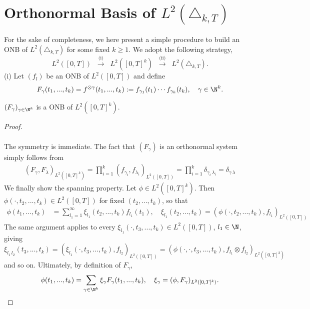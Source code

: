 \section{Orthonormal Basis of $L^2(\triangle_{k,T})$}
For the sake of completeness, we here present a simple procedure to build an ONB of $L^2(\triangle_{k,T})$ for some fixed $k\ge 1$. We adopt the following strategy,
$$ L^2([0,T]) \;\; \overset{\text{(i)}}{\longrightarrow}
 \;\; L^2([0,T]^k) \;\; \overset{\text{(ii)}}{\longrightarrow} \;\; L^2(\triangle_{k,T}).$$
 (i) 
Let $(f_l)$ be an ONB of $L^2([0,T])$  and define
    $$F_{\gamma}(t_1,...,t_k) = f^{\otimes \gamma}(t_1,...,t_k) := f_{\gamma_1}(t_1)\cdots f_{\gamma_k}(t_k),\quad  \gamma \in \N^k. $$
    
\begin{proposition}
    $(F_{\gamma})_{\gamma \in \N^k}$ is a  ONB of $L^2([0,T]^k)$. 
\end{proposition}
\begin{proof}
\\
\\
The symmetry is immediate. The fact that $(F_{\gamma})$ is an orthonormal system  simply follows from 
    \begin{align*}
        (F_{\gamma},F_{\lambda})_{L^2([0,T]^k)} = \prod_{i=1}^k (f_{\gamma_i},f_{\lambda_i})_{L^2([0,T])} = \prod_{i=1}^k \delta_{\gamma_i\, \lambda_i} = \delta_{\gamma\, \lambda}
    \end{align*}
   We finally show the spanning property. Let $\phi \in L^2([0,T]^k)$. Then $\phi(\cdot,t_2,...,t_k)\in L^2([0,T]) $ for fixed $(t_2,...,t_k)$, so that 
       \begin{align*}
       \phi(t_1,...,t_k) &= \sum_{l_1=1}^{\infty} \xi_{l_1}(t_2,...,t_k) f_{l_1}(t_1) , \quad  \xi_{l_1}(t_2,...,t_k)= (\phi(\cdot,t_2,...,t_k),f_{l_1})_{L^2([0,T])}
    \end{align*}
    The same argument applies to every
    $\xi_{l_1}(\cdot,t_3,...,t_k) \in L^2([0,T]) $, $l_1 \in \N$, giving 
    $$\xi_{l_1\, l_2}(t_3,...,t_k) = (\xi_{l_1}(\cdot,t_3,...,t_k),f_{l_2})_{L^2([0,T])} = (\phi(\cdot,\cdot,t_3,...,t_k),f_{l_1} \otimes f_{l_2})_{L^2([0,T]^2)} $$ and so on. Ultimately,  by definition of $F_{\gamma}$,
    $$\phi(t_1,...,t_k) =  \sum_{\gamma \in \N^{k}}  \xi_{\gamma} F_{\gamma}(t_1,...,t_k), \quad \xi_{\gamma} = (\phi,F_{\gamma})_{L^2([0,T]^k)}.  $$
\end{proof} 

 
